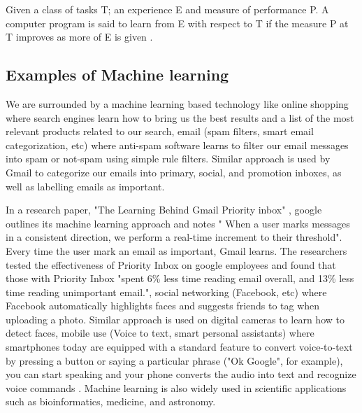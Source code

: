 Given a class of tasks T; an experience E and measure of performance P. A computer program is said to learn from E with respect to T if the measure P at T improves as more of E is given \citep{michalski2013machine}. 
\subsection{Examples of Machine learning}
We are surrounded by a machine learning based technology like online shopping where  search engines learn how to bring us the best results and a list of the most relevant products related to our search, email (spam filters, smart email categorization, etc)  where anti-spam software
learns to filter our email messages into spam or not-spam using simple rule filters. Similar approach is used by Gmail to categorize our emails into primary, social, and promotion inboxes, as well as labelling emails as important. 

In a research paper, "The Learning Behind Gmail Priority inbox" \citep{aberdeen2010learning}, google outlines its machine learning approach  and notes " When a user marks messages in a consistent direction, we perform a real-time increment to their threshold". Every time the user mark an email as important, Gmail learns. The researchers tested the effectiveness of Priority Inbox on google employees and found that those with Priority Inbox "spent 6\% less time reading email overall, and 13\% less time reading unimportant email.", social networking (Facebook, etc) where Facebook  automatically highlights faces and suggests friends to tag when uploading a photo. Similar approach is used on digital cameras to learn how to detect faces,  mobile use (Voice to text, smart personal assistants)  where smartphones today are equipped with a standard feature to convert voice-to-text by pressing a button or saying a particular phrase ("Ok Google", for example), you can start speaking and your phone converts the audio into text and recognize voice commands \citep{Techemergence}.  
Machine learning is also widely used in scientific applications such as bioinformatics, medicine, and astronomy.



